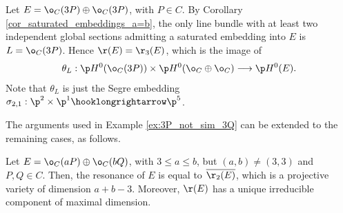 \documentclass[10pt, leqno]{amsart}
\begin{document}
\begin{exmp} \label{ex:3P_sim_3Q}
Let $E = \o_C(3P) \oplus \o_C(3P)$, with $P \in C$. By Corollary \ref{cor_saturated_embeddings_a=b}, the only line bundle with at least two independent global sections admitting a saturated embedding into $E$ is $L = \o_C(3P)$. Hence $\r(E) = \r_3(E)$, which is the image of 
\[
\theta_L : \p H^0(\o_C(3P)) \times \p H^0(\o_C \oplus \o_C) \longrightarrow \p H^0(E).
\]
Note that $\theta_L$ is just the Segre embedding $\sigma_{2,1}: \p^2 \times \p^1 \hooklongrightarrow \p^5$.
\end{exmp}

The arguments used in Example \ref{ex:3P_not_sim_3Q} can be extended to the remaining cases, as follows.

\begin{thm} \label{thm:general_split_bundles}
Let $E = \o_C(aP) \oplus \o_C(bQ)$, with $3 \le a \le b$, but $(a,b) \neq (3,3)$ and $P, Q \in C$. 
Then, the resonance of $E$ is equal to $\overline{\r_2(E)}$, which is a projective variety of dimension $a + b - 3$.
Moreover, $\r(E)$ has a unique irreducible component of maximal dimension.
\end{thm}
\end{document}
